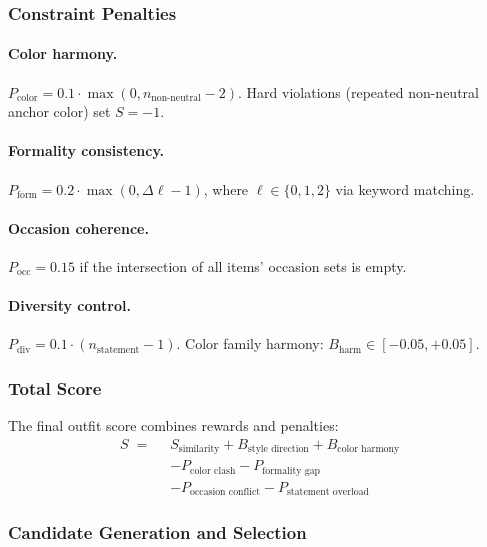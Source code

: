 \documentclass[10pt,twocolumn]{article}
\begin{document}
\subsubsection{Constraint Penalties}

\paragraph{Color harmony.}
$P_{\text{color}} = 0.1 \cdot \max(0, n_{\text{non-neutral}} - 2)$.
Hard violations (repeated non-neutral anchor color) set $S = -1$.

\paragraph{Formality consistency.}
$P_{\text{form}} = 0.2 \cdot \max(0, \Delta\ell - 1)$, where
$\ell \in \{0, 1, 2\}$ via keyword matching.

\paragraph{Occasion coherence.}
$P_{\text{occ}} = 0.15$ if the intersection of all items' occasion sets is
empty.

\paragraph{Diversity control.}
$P_{\text{div}} = 0.1 \cdot (n_{\text{statement}} - 1)$.
Color family harmony: $B_{\text{harm}} \in [-0.05, +0.05]$.

\subsubsection{Total Score}

The final outfit score combines rewards and penalties:
\begin{align}
  S \;=\;\; & S_{\text{similarity}} + B_{\text{style direction}} + B_{\text{color harmony}} \nonumber\\
            & - P_{\text{color clash}} - P_{\text{formality gap}} \nonumber\\
            & - P_{\text{occasion conflict}} - P_{\text{statement overload}}
\label{eq:total}
\end{align}

\subsubsection{Candidate Generation and Selection}
\end{document}
